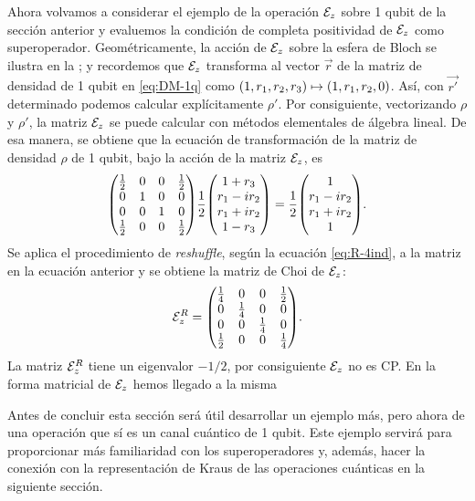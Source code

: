 Ahora volvamos a considerar el ejemplo de la operación $\mathcal{E}_z$ 
sobre 1 qubit de la sección anterior y evaluemos la condición de 
completa positividad de $\mathcal{E}_z$ como superoperador. 
Geométricamente, la acción de $\mathcal{E}_z$ sobre la 
esfera de Bloch se ilustra en la ;
y recordemos que $\mathcal{E}_z$ transforma al vector $\vec{r}$ 
de la matriz de densidad de 1 qubit en \eqref{eq:DM-1q} 
como $\qty(1,r_1,r_2,r_3)\mapsto\qty(1,r_1,r_2,0)$. Así, 
con $\vec{r'}$ determinado podemos calcular 
explícitamente $\rho'$.
Por consiguiente, vectorizando $\rho$ y $\rho'$, la matriz $\mathcal{E}_z$ 
se puede calcular con métodos elementales de álgebra lineal. 
De esa manera, se obtiene que la ecuación de transformación 
de la matriz de densidad $\rho$ de 1 qubit, bajo la
acción de la matriz $\mathcal{E}_z$, es
\begin{align}
\mqty(
\frac{1}{2} & 0 & 0 & \frac{1}{2} \\
0 & 1 & 0 & 0 \\
0 & 0 & 1 & 0 \\
\frac{1}{2} & 0 & 0 & \frac{1}{2} \\
)
\frac{1}{2}
\mqty(
1+r_3\\r_1-ir_2\\r_1+ir_2\\1-r_3
)
=
\frac{1}{2}
\mqty(
1\\r_1-ir_2\\r_1+ir_2\\1
).
\label{eq:Ez-matrix}
\end{align}
Se aplica el procedimiento de \textit{reshuffle},
según la ecuación \eqref{eq:R-4ind}, a la matriz en la ecuación 
anterior y se obtiene la matriz de Choi de $\mathcal{E}_z$:
\begin{align}
\E_z^R=
\mqty(
\frac{1}{4} & 0 & 0 & \frac{1}{2} \\
0 & \frac{1}{4} & 0 & 0 \\
0 & 0 & \frac{1}{4} & 0 \\
\frac{1}{2} & 0 & 0 & \frac{1}{4} 
).
\label{eq:ch2-Choi-Ez}
\end{align}
La matriz $\mathcal{E}_z^R$ tiene un eigenvalor $-1/2$, 
por consiguiente $\mathcal{E}_z$ no es CP. 
En la forma matricial de $\mathcal{E}_z$ hemos llegado a la misma

Antes de concluir esta sección será útil desarrollar un ejemplo más, 
pero ahora de una operación que sí es un canal cuántico de 1 qubit. Este 
ejemplo servirá para proporcionar más familiaridad con  
los superoperadores y, además, hacer la conexión con 
la representación de Kraus de las operaciones cuánticas en la siguiente sección.

